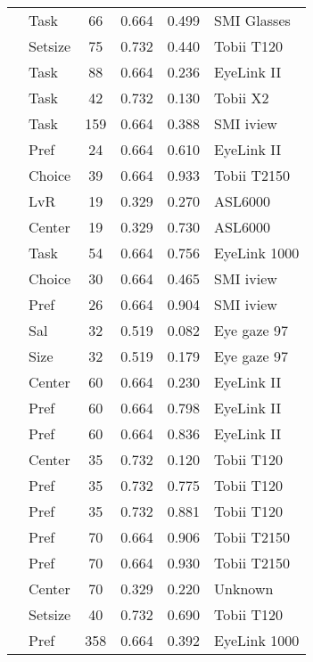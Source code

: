 \begin{longtable}{p{8cm}lcccl}
  \cite{guyader2017} & Task & 66 & 0.664 & 0.499 & SMI Glasses \\ 
  \cite{hong2016a} & Setsize & 75 & 0.732 & 0.440 & Tobii T120 \\ 
  \cite{huang2011} & Task & 88 & 0.664 & 0.236 & EyeLink II \\ 
  \cite{hwang2017} & Task & 42 & 0.732 & 0.130 & Tobii X2 \\ 
  \cite{keller2014} & Task & 159 & 0.664 & 0.388 & SMI iview \\ 
  \cite{kim2012a} & Pref & 24 & 0.664 & 0.610 & EyeLink II \\ 
  \cite{krajbich2010a} & Choice & 39 & 0.664 & 0.933 & Tobii T2150 \\ 
  \cite{kreplin2014a} & LvR & 19 & 0.329 & 0.270 & ASL6000 \\ 
  \cite{kreplin2014a} & Center & 19 & 0.329 & 0.730 & ASL6000 \\ 
  \cite{leboeuf2016} & Task & 54 & 0.664 & 0.756 & EyeLink 1000 \\ 
  \cite{lindner2014} & Choice & 30 & 0.664 & 0.465 & SMI iview \\ 
  \cite{lindner2014} & Pref & 26 & 0.664 & 0.904 & SMI iview \\ 
  \cite{lohse1997a} & Sal & 32 & 0.519 & 0.082 & Eye gaze 97 \\ 
  \cite{lohse1997a} & Size & 32 & 0.519 & 0.179 & Eye gaze 97 \\ 
  \cite{meissner2016a} & Center & 60 & 0.664 & 0.230 & EyeLink II \\ 
  \cite{meissner2016a} & Pref & 60 & 0.664 & 0.798 & EyeLink II \\ 
  \cite{meissner2016a} & Pref & 60 & 0.664 & 0.836 & EyeLink II \\ 
  \cite{meissner2016a} & Center & 35 & 0.732 & 0.120 & Tobii T120 \\ 
  \cite{meissner2016a} & Pref & 35 & 0.732 & 0.775 & Tobii T120 \\ 
  \cite{meissner2016a} & Pref & 35 & 0.732 & 0.881 & Tobii T120 \\ 
  \cite{meissner2016a} & Pref & 70 & 0.664 & 0.906 & Tobii T2150 \\ 
  \cite{meissner2016a} & Pref & 70 & 0.664 & 0.930 & Tobii T2150 \\ 
  \cite{meissner2016a} & Center & 70 & 0.329 & 0.220 & Unknown \\ 
  \cite{meissner2016b} & Setsize & 40 & 0.732 & 0.690 & Tobii T120 \\ 
  \cite{miller2015} & Pref & 358 & 0.664 & 0.392 & EyeLink 1000 \\ 

\end{longtable}
